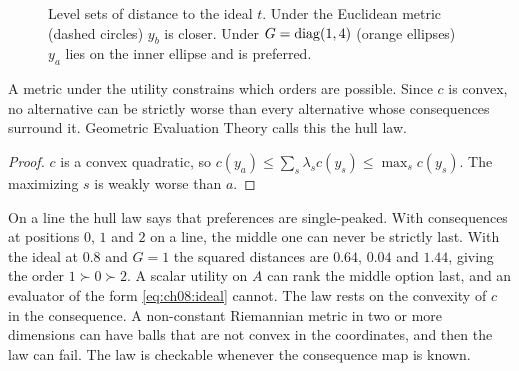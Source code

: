 
\begin{figure}[tbp]
\centering
{}
\caption{Level sets of distance to the ideal $t$. Under the Euclidean metric (dashed circles) $y_b$ is closer. Under $G=\operatorname{diag}(1,4)$ (orange ellipses) $y_a$ lies on the inner ellipse and is preferred.}
\label{fig:ch08:ideal}
\end{figure}

A metric under the utility constrains which orders are possible. Since $c$ is convex, no alternative can be strictly worse than every alternative whose consequences surround it. Geometric Evaluation Theory calls this the hull law.


\begin{proof}
$c$ is a convex quadratic, so $c(y_a)\le\sum_s\lambda_sc(y_s)\le\max_sc(y_s)$. The maximizing $s$ is weakly worse than $a$.
\end{proof}

On a line the hull law says that preferences are single-peaked. With consequences at positions $0$, $1$ and $2$ on a line, the middle one can never be strictly last. With the ideal at $0.8$ and $G=1$ the squared distances are $0.64$, $0.04$ and $1.44$, giving the order $1\succ0\succ2$. A scalar utility on $A$ can rank the middle option last, and an evaluator of the form \eqref{eq:ch08:ideal} cannot. The law rests on the convexity of $c$ in the consequence. A non-constant Riemannian metric in two or more dimensions can have balls that are not convex in the coordinates, and then the law can fail. The law is checkable whenever the consequence map is known.

